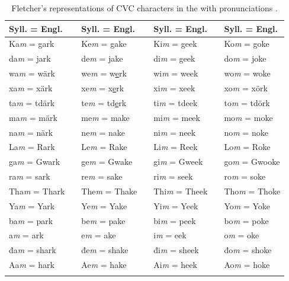 \documentclass[output=paper]{LSP/langsci}
\begin{document}
\begin{table}
\begin{tabular}{lllllll}
\lsptoprule
Syll. = Engl. && Syll. = Engl. && Syll. = Engl. && Syll. = Engl.\\
\midrule
Ka\emph{m} = gark && Ke\emph{m} = gake && Ki\emph{m} = geek && Ko\emph{m} = goke\\
da\emph{m} = jark && de\emph{m} = jake && di\emph{m} = geek && do\emph{m} = joke\\
wa\emph{m} = wärk && we\emph{m} = w\underline{e}rk && wi\emph{m} = week && wo\emph{m} = woke\\
xa\emph{m} = xärk && xe\emph{m} = x\underline{e}rk && xi\emph{m} = xeek && xo\emph{m} = xörk\\
ta\emph{m} = tdärk && te\emph{m} = td\underline{e}rk && ti\emph{m} = tdeek && to\emph{m} = tdörk\\
ma\emph{m} = märk && me\emph{m} = make && mi\emph{m} = meek && mo\emph{m} = moke\\
na\emph{m} = närk && ne\emph{m} = nake && ni\emph{m} = neek && no\emph{m} = noke\\
La\emph{m} = Rark && Le\emph{m} = Rake && Li\emph{m} = Reek && Lo\emph{m} = Roke\\
ga\emph{m} = Gwark && ge\emph{m} = Gwake && gi\emph{m} = Gweek && go\emph{m} = Gwooke\\
ra\emph{m} = sark && re\emph{m} = sake && ri\emph{m} = seek && ro\emph{m} = soke\\
Tha\emph{m} = Thark && The\emph{m} = Thake && Thi\emph{m} = Theek && Tho\emph{m} = Thoke\\
Ya\emph{m} = Yark && Ye\emph{m} = Yake && Yi\emph{m} = Yeek && Yo\emph{m} = Yoke\\
ba\emph{m} = park && be\emph{m} = pake && bi\emph{m} = peek && bo\emph{m} = poke\\
a\emph{m} = ark && e\emph{m} = ake && i\emph{m} = eek && o\emph{m} = oke\\
đa\emph{m} = shark && đe\emph{m} = shake && đi\emph{m} = sheek && đo\emph{m} = shoke\\
Aa\emph{m} = hark && Ae\emph{m} = hake && Ai\emph{m} = heek && Ao\emph{m} = hoke\\
\lspbottomrule
\end{tabular}
\caption{Fletcher's representations of CVC characters in the   with  pronunciations \citep[adapted from][300]{Fletcher1890a}.}
\label{fletchercvc}
\end{table}
\end{document}
